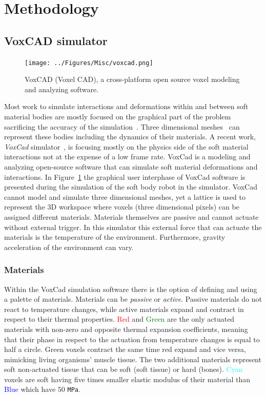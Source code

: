 \documentclass{sig-alternate}
\begin{document}
\section{Methodology}
\subsection{VoxCAD simulator}

\begin{figure}[t!]
\centering
\texttt{[image: ../Figures/Misc/voxcad.png]}
\caption{VoxCAD (Voxel CAD), a cross-platform open source voxel modeling and analyzing software.}
\label{fig:VoxCAD}
\end{figure}

Most work to simulate interactions and deformations within and between soft material bodies are mostly focused on the graphical part of the problem~\cite{faloutsos1997dynamic} sacrificing the accuracy of the simulation~\cite{teschner2004versatile}. Three dimensional meshes~\cite{muller2002stable} can represent these bodies including the dynamics of their materials. A recent work, \emph{VoxCad} simulator~\cite{hiller2012dynamic}, is focusing mostly on the physics side of the soft material interactions not at the expense of a low frame rate. VoxCad is a modeling and analyzing open-source software that can simulate soft material deformations and interactions. In Figure~\ref{fig:VoxCAD} the graphical user interphase of VoxCad software is presented during the simulation of the soft body robot in the simulator. VoxCad cannot model and simulate three dimensional meshes, yet a lattice is used to represent the 3D workspace where voxels (three dimensional pixels) can be assigned different materials. Materials themselves are passive and cannot actuate without external trigger. In this simulator this external force that can actuate the materials is the temperature of the environment. Furthermore, gravity acceleration of the environment can vary.

\subsubsection*{Materials}

Within the VoxCad simulation software there is the option of defining and using a palette of materials. Materials can be \emph{passive} or \emph{active}. Passive materials do not react to temperature changes, while active materials expand and contract in respect to their thermal properties. \textcolor{Red}{Red} and \textcolor{Green}{Green} are the only actuated materials with non-zero and opposite thermal expansion coefficients, meaning that their phase in respect to the actuation from temperature changes is equal to half a circle. Green voxels contract the same time red expand and vice versa, mimicking living organisms' muscle tissue. The two additional materials represent soft non-actuated tissue that can be soft (soft tissue) or hard (bones). \textcolor{Cyan}{Cyan} voxels are soft having five times smaller elastic modulus of their material than \textcolor{Blue}{Blue} which have $50$ \texttt{MPa}.
\end{document}
